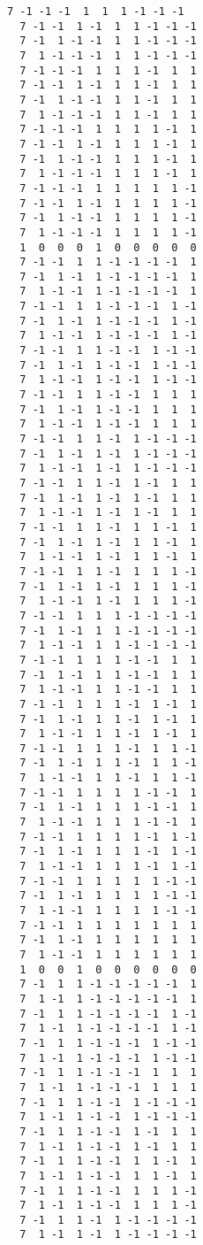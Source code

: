 \documentclass[%
 showpacs,
 showkeys,
 preprintnumbers,
 amsmath,amssymb,
 aps,
  pra,
  longbibliography,
 floatfix,
 ]{revtex4-1}
\begin{document}
{\begin{lstlisting}[backgroundcolor=\color{yellow!10},framerule=0pt,breaklines=true, frame=tb]
  7 -1 -1 -1  1  1  1 -1 -1 -1
  7 -1 -1  1 -1  1  1 -1 -1 -1
  7 -1  1 -1 -1  1  1 -1 -1 -1
  7  1 -1 -1 -1  1  1 -1 -1 -1
  7 -1 -1 -1  1  1  1 -1  1  1
  7 -1 -1  1 -1  1  1 -1  1  1
  7 -1  1 -1 -1  1  1 -1  1  1
  7  1 -1 -1 -1  1  1 -1  1  1
  7 -1 -1 -1  1  1  1  1 -1  1
  7 -1 -1  1 -1  1  1  1 -1  1
  7 -1  1 -1 -1  1  1  1 -1  1
  7  1 -1 -1 -1  1  1  1 -1  1
  7 -1 -1 -1  1  1  1  1  1 -1
  7 -1 -1  1 -1  1  1  1  1 -1
  7 -1  1 -1 -1  1  1  1  1 -1
  7  1 -1 -1 -1  1  1  1  1 -1
  1  0  0  0  1  0  0  0  0  0
  7 -1 -1  1  1 -1 -1 -1 -1  1
  7 -1  1 -1  1 -1 -1 -1 -1  1
  7  1 -1 -1  1 -1 -1 -1 -1  1
  7 -1 -1  1  1 -1 -1 -1  1 -1
  7 -1  1 -1  1 -1 -1 -1  1 -1
  7  1 -1 -1  1 -1 -1 -1  1 -1
  7 -1 -1  1  1 -1 -1  1 -1 -1
  7 -1  1 -1  1 -1 -1  1 -1 -1
  7  1 -1 -1  1 -1 -1  1 -1 -1
  7 -1 -1  1  1 -1 -1  1  1  1
  7 -1  1 -1  1 -1 -1  1  1  1
  7  1 -1 -1  1 -1 -1  1  1  1
  7 -1 -1  1  1 -1  1 -1 -1 -1
  7 -1  1 -1  1 -1  1 -1 -1 -1
  7  1 -1 -1  1 -1  1 -1 -1 -1
  7 -1 -1  1  1 -1  1 -1  1  1
  7 -1  1 -1  1 -1  1 -1  1  1
  7  1 -1 -1  1 -1  1 -1  1  1
  7 -1 -1  1  1 -1  1  1 -1  1
  7 -1  1 -1  1 -1  1  1 -1  1
  7  1 -1 -1  1 -1  1  1 -1  1
  7 -1 -1  1  1 -1  1  1  1 -1
  7 -1  1 -1  1 -1  1  1  1 -1
  7  1 -1 -1  1 -1  1  1  1 -1
  7 -1 -1  1  1  1 -1 -1 -1 -1
  7 -1  1 -1  1  1 -1 -1 -1 -1
  7  1 -1 -1  1  1 -1 -1 -1 -1
  7 -1 -1  1  1  1 -1 -1  1  1
  7 -1  1 -1  1  1 -1 -1  1  1
  7  1 -1 -1  1  1 -1 -1  1  1
  7 -1 -1  1  1  1 -1  1 -1  1
  7 -1  1 -1  1  1 -1  1 -1  1
  7  1 -1 -1  1  1 -1  1 -1  1
  7 -1 -1  1  1  1 -1  1  1 -1
  7 -1  1 -1  1  1 -1  1  1 -1
  7  1 -1 -1  1  1 -1  1  1 -1
  7 -1 -1  1  1  1  1 -1 -1  1
  7 -1  1 -1  1  1  1 -1 -1  1
  7  1 -1 -1  1  1  1 -1 -1  1
  7 -1 -1  1  1  1  1 -1  1 -1
  7 -1  1 -1  1  1  1 -1  1 -1
  7  1 -1 -1  1  1  1 -1  1 -1
  7 -1 -1  1  1  1  1  1 -1 -1
  7 -1  1 -1  1  1  1  1 -1 -1
  7  1 -1 -1  1  1  1  1 -1 -1
  7 -1 -1  1  1  1  1  1  1  1
  7 -1  1 -1  1  1  1  1  1  1
  7  1 -1 -1  1  1  1  1  1  1
  1  0  0  1  0  0  0  0  0  0
  7 -1  1  1 -1 -1 -1 -1 -1  1
  7  1 -1  1 -1 -1 -1 -1 -1  1
  7 -1  1  1 -1 -1 -1 -1  1 -1
  7  1 -1  1 -1 -1 -1 -1  1 -1
  7 -1  1  1 -1 -1 -1  1 -1 -1
  7  1 -1  1 -1 -1 -1  1 -1 -1
  7 -1  1  1 -1 -1 -1  1  1  1
  7  1 -1  1 -1 -1 -1  1  1  1
  7 -1  1  1 -1 -1  1 -1 -1 -1
  7  1 -1  1 -1 -1  1 -1 -1 -1
  7 -1  1  1 -1 -1  1 -1  1  1
  7  1 -1  1 -1 -1  1 -1  1  1
  7 -1  1  1 -1 -1  1  1 -1  1
  7  1 -1  1 -1 -1  1  1 -1  1
  7 -1  1  1 -1 -1  1  1  1 -1
  7  1 -1  1 -1 -1  1  1  1 -1
  7 -1  1  1 -1  1 -1 -1 -1 -1
  7  1 -1  1 -1  1 -1 -1 -1 -1

\end{lstlisting}}
\end{document}
